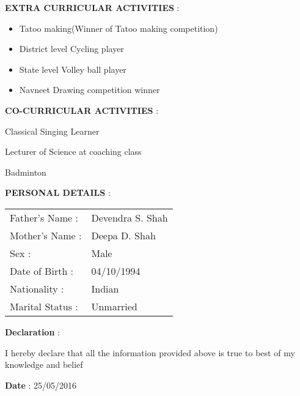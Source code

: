 \documentclass{article}
\begin{document}
 \begin{flushleft}
 \textbf{EXTRA CURRICULAR ACTIVITIES} :
 \begin{itemize}
 \item Tatoo making(Winner of Tatoo making competition)
 \item District level Cycling player
 \item State level Volley ball player
 \item Navneet Drawing competition winner
  \end{itemize}
  \end{flushleft}
 
\begin{flushleft}
 \textbf{CO-CURRICULAR ACTIVITIES} :
 \enumerate
 \item Classical Singing Learner
 \item Lecturer of Science at coaching class
 \item Badminton 

\end{flushleft}
 
\begin{flushleft}
 \textbf{PERSONAL DETAILS} :
 \end{flushleft}

  \begin{tabu} to 0.6\textwidth {X[l] X[l]}
    Father's Name : & Devendra S. Shah \\
    Mother's Name : & Deepa D. Shah \\
    Sex : & Male \\
    Date of Birth : & 04/10/1994 \\
    Nationality : & Indian \\
    Marital Status : & Unmarried \\
  \end{tabu}


\begin{flushleft}

\textbf{Declaration} :

 \hfill I  hereby declare that all the information provided above is true to best of my knowledge and belief
  
\end{flushleft}
 \begin{flushleft}
 \textbf{Date} : 25/05/2016
 \end{flushleft}
\end{document}
